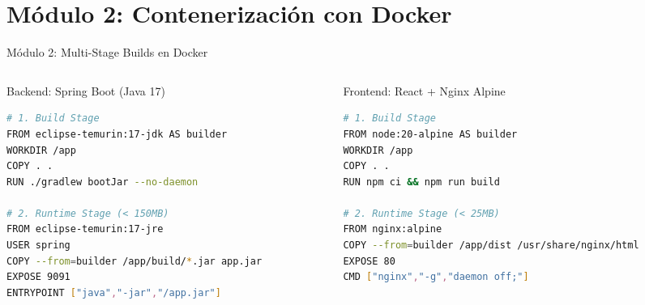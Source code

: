 \documentclass[aspectratio=169,10pt]{beamer}
\begin{document}
\section{Módulo 2: Contenerización con Docker}

\begin{frame}[fragile]{Módulo 2: Multi-Stage Builds en Docker}
  \begin{columns}
    \begin{column}{0.5\textwidth}
      \begin{block}{Backend: Spring Boot (Java 17)}
        \begin{lstlisting}[language=bash]
# 1. Build Stage
FROM eclipse-temurin:17-jdk AS builder
WORKDIR /app
COPY . .
RUN ./gradlew bootJar --no-daemon

# 2. Runtime Stage (< 150MB)
FROM eclipse-temurin:17-jre
USER spring
COPY --from=builder /app/build/*.jar app.jar
EXPOSE 9091
ENTRYPOINT ["java","-jar","/app.jar"]
        \end{lstlisting}
      \end{block}
    \end{column}
    \begin{column}{0.5\textwidth}
      \begin{block}{Frontend: React + Nginx Alpine}
        \begin{lstlisting}[language=bash]
# 1. Build Stage
FROM node:20-alpine AS builder
WORKDIR /app
COPY . .
RUN npm ci && npm run build

# 2. Runtime Stage (< 25MB)
FROM nginx:alpine
COPY --from=builder /app/dist /usr/share/nginx/html
EXPOSE 80
CMD ["nginx","-g","daemon off;"]
        \end{lstlisting}
      \end{block}
    \end{column}
  \end{columns}
\end{frame}
\end{document}
